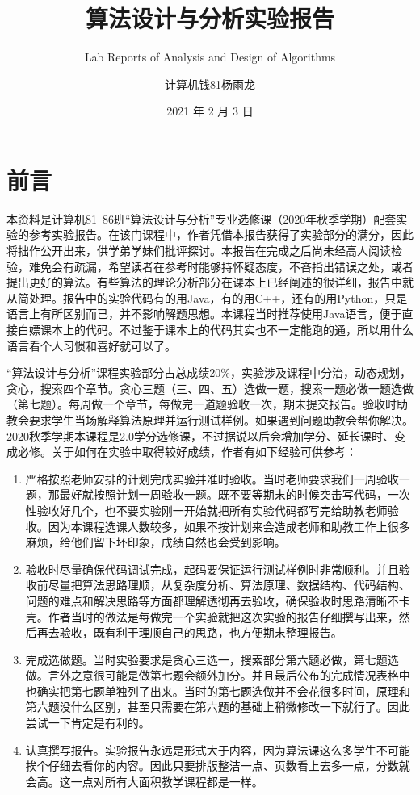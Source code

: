 \documentclass[
  10pt,
  twoside,
  openany,
  b5paper, %
  colorscheme = basic, %
]{qyxf-book}
\title{算法设计与分析实验报告}
\subtitle{Lab Reports of Analysis and Design of Algorithms}  %
\author{计算机钱81杨雨龙}
\date{2021 年 2 月 3 日}
\begin{document}
\maketitle
\chapter*{前言}
\thispagestyle{empty}

本资料是计算机81~86班“算法设计与分析”专业选修课（2020年秋季学期）配套实验的参考实验报告。在该门课程中，作者凭借本报告获得了实验部分的满分，因此将拙作公开出来，供学弟学妹们批评探讨。本报告在完成之后尚未经高人阅读检验，难免会有疏漏，希望读者在参考时能够持怀疑态度，不吝指出错误之处，或者提出更好的算法。有些算法的理论分析部分在课本上已经阐述的很详细，报告中就从简处理。报告中的实验代码有的用Java，有的用C++，还有的用Python，只是语言上有所区别而已，并不影响解题思想。本课程当时推荐使用Java语言，便于直接白嫖课本上的代码。不过鉴于课本上的代码其实也不一定能跑的通，所以用什么语言看个人习惯和喜好就可以了。

“算法设计与分析”课程实验部分占总成绩20\%，实验涉及课程中分治，动态规划，贪心，搜索四个章节。贪心三题（三、四、五）选做一题，搜索一题必做一题选做（第七题）。每周做一个章节，每做完一道题验收一次，期末提交报告。验收时助教会要求学生当场解释算法原理并运行测试样例。如果遇到问题助教会帮你解决。2020秋季学期本课程是2.0学分选修课，不过据说以后会增加学分、延长课时、变成必修。关于如何在实验中取得较好成绩，作者有如下经验可供参考：
\begin{enumerate}
	\item 严格按照老师安排的计划完成实验并准时验收。当时老师要求我们一周验收一题，那最好就按照计划一周验收一题。既不要等期末的时候突击写代码，一次性验收好几个，也不要实验刚一开始就把所有实验代码都写完给助教老师验收。因为本课程选课人数较多，如果不按计划来会造成老师和助教工作上很多麻烦，给他们留下坏印象，成绩自然也会受到影响。
	
	\item 验收时尽量确保代码调试完成，起码要保证运行测试样例时非常顺利。并且验收前尽量把算法思路理顺，从复杂度分析、算法原理、数据结构、代码结构、问题的难点和解决思路等方面都理解透彻再去验收，确保验收时思路清晰不卡壳。作者当时的做法是每做完一个实验就把这次实验的报告仔细撰写出来，然后再去验收，既有利于理顺自己的思路，也方便期末整理报告。
	
	\item 完成选做题。当时实验要求是贪心三选一，搜索部分第六题必做，第七题选做。言外之意很可能是做第七题会额外加分。并且最后公布的完成情况表格中也确实把第七题单独列了出来。当时的第七题选做并不会花很多时间，原理和第六题没什么区别，甚至只需要在第六题的基础上稍微修改一下就行了。因此尝试一下肯定是有利的。

	\item 认真撰写报告。实验报告永远是形式大于内容，因为算法课这么多学生不可能挨个仔细去看你的内容。因此只要排版整洁一点、页数看上去多一点，分数就会高。这一点对所有大面积教学课程都是一样。

\end{enumerate}
\newpage

\newpage
\setcounter{page}{1}


\end{document}
